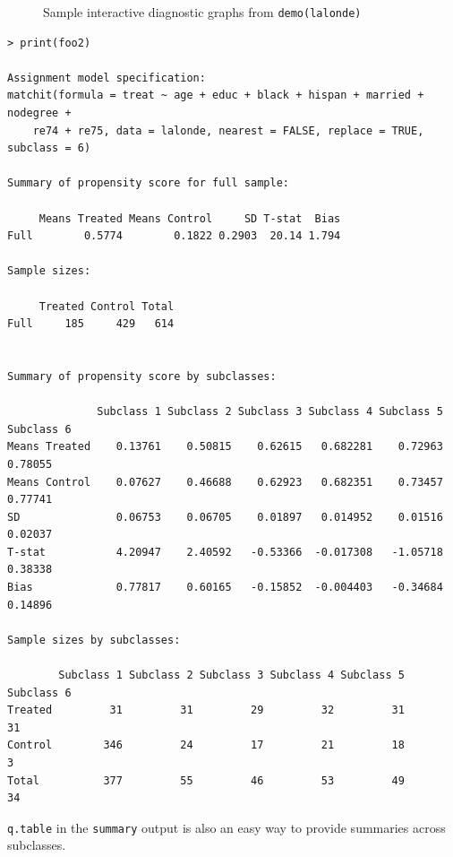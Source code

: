 \documentclass[oneside,letterpaper,titlepage]{article}
\begin{document}
\begin{figure}[tbp]
\begin{center}
    \hfill
    \caption{Sample interactive diagnostic graphs from \texttt{demo(lalonde)}}
\label{diags}
\end{center}
\end{figure}


\begin{verbatim}
> print(foo2)
 
Assignment model specification:
matchit(formula = treat ~ age + educ + black + hispan + married + nodegree + 
    re74 + re75, data = lalonde, nearest = FALSE, replace = TRUE, subclass = 6)
 
Summary of propensity score for full sample:
 
     Means Treated Means Control     SD T-stat  Bias
Full        0.5774        0.1822 0.2903  20.14 1.794
 
Sample sizes:
 
     Treated Control Total
Full     185     429   614
 
 
Summary of propensity score by subclasses:
 
              Subclass 1 Subclass 2 Subclass 3 Subclass 4 Subclass 5 Subclass 6
Means Treated    0.13761    0.50815    0.62615   0.682281    0.72963    0.78055
Means Control    0.07627    0.46688    0.62923   0.682351    0.73457    0.77741
SD               0.06753    0.06705    0.01897   0.014952    0.01516    0.02037
T-stat           4.20947    2.40592   -0.53366  -0.017308   -1.05718    0.38338
Bias             0.77817    0.60165   -0.15852  -0.004403   -0.34684    0.14896
 
Sample sizes by subclasses:
 
        Subclass 1 Subclass 2 Subclass 3 Subclass 4 Subclass 5 Subclass 6
Treated         31         31         29         32         31         31
Control        346         24         17         21         18          3
Total          377         55         46         53         49         34
\end{verbatim}

\noindent 
\texttt{q.table} in the {\tt summary} output is also an easy way to
provide summaries across subclasses.
\end{document}
